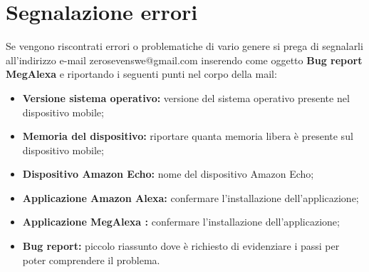 \chapter{Segnalazione errori}
Se vengono riscontrati errori o problematiche di vario genere si prega di segnalarli all’indirizzo
e-mail zerosevenswe@gmail.com inserendo come oggetto \textbf{Bug report MegAlexa}  e riportando i seguenti punti nel corpo della mail:
 \begin{itemize}
	\item \textbf{Versione sistema operativo:} versione del sistema operativo presente nel dispositivo mobile;
	\item \textbf{Memoria del dispositivo:} riportare quanta memoria libera è presente sul dispositivo mobile;
	\item \textbf{Dispositivo Amazon Echo:} nome del dispositivo Amazon Echo;
	\item \textbf{Applicazione Amazon Alexa:} confermare l'installazione dell'applicazione;
	\item \textbf{Applicazione MegAlexa :}  confermare l'installazione dell'applicazione;
	\item \textbf{Bug report:} piccolo riassunto dove è richiesto di evidenziare i passi per poter 
	comprendere il problema.
\end{itemize}
